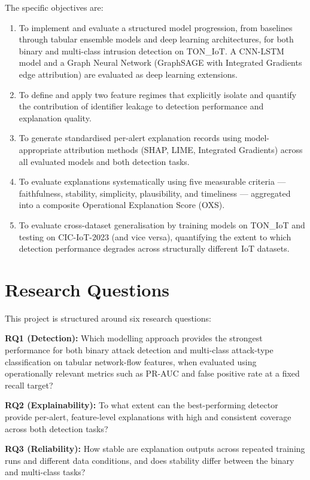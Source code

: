 \documentclass[12pt,a4paper]{report}
\begin{document}
The specific objectives are:
\begin{enumerate}
  \item To implement and evaluate a structured model progression, from baselines through tabular ensemble models and deep learning architectures, for both binary and multi-class intrusion detection on TON\_IoT. A CNN-LSTM model and a Graph Neural Network (GraphSAGE with Integrated Gradients edge attribution) are evaluated as deep learning extensions.
  \item To define and apply two feature regimes that explicitly isolate and quantify the contribution of identifier leakage to detection performance and explanation quality.
  \item To generate standardised per-alert explanation records using model-appropriate attribution methods (SHAP, LIME, Integrated Gradients) across all evaluated models and both detection tasks.
  \item To evaluate explanations systematically using five measurable criteria --- faithfulness, stability, simplicity, plausibility, and timeliness --- aggregated into a composite Operational Explanation Score (OXS).
  \item To evaluate cross-dataset generalisation by training models on TON\_IoT and testing on CIC-IoT-2023 (and vice versa), quantifying the extent to which detection performance degrades across structurally different IoT datasets.
\end{enumerate}

\section{Research Questions}
\label{sec:rqs}

This project is structured around six research questions:

\noindent\textbf{RQ1 (Detection):} Which modelling approach provides the strongest performance for both binary attack detection and multi-class attack-type classification on tabular network-flow features, when evaluated using operationally relevant metrics such as PR-AUC and false positive rate at a fixed recall target?

\noindent\textbf{RQ2 (Explainability):} To what extent can the best-performing detector provide per-alert, feature-level explanations with high and consistent coverage across both detection tasks?

\noindent\textbf{RQ3 (Reliability):} How stable are explanation outputs across repeated training runs and different data conditions, and does stability differ between the binary and multi-class tasks?
\end{document}
